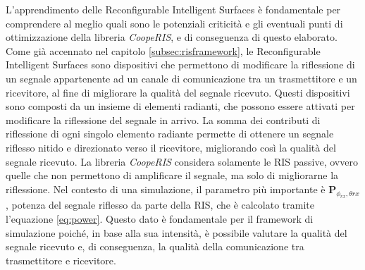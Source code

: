 L'apprendimento delle Reconfigurable Intelligent Surfaces è fondamentale per comprendere
al meglio quali sono le potenziali criticità e gli eventuali punti di ottimizzazione
della libreria \textit{CoopeRIS}, e di conseguenza di questo elaborato. Come già
accennato nel capitolo \ref{subsec:risframework}, le Reconfigurable Intelligent Surfaces
sono dispositivi che permettono di modificare la riflessione di un segnale appartenente
ad un canale di comunicazione tra un trasmettitore e un ricevitore, al fine di
migliorare la qualità del segnale ricevuto. Questi dispositivi sono composti da un
insieme di elementi radianti, che possono essere attivati per modificare la
riflessione del segnale in arrivo. La somma dei contributi di riflessione di ogni
singolo elemento radiante permette di ottenere un segnale riflesso nitido e direzionato
verso il ricevitore, migliorando così la qualità del segnale ricevuto. La libreria
\textit{CoopeRIS} considera solamente le RIS passive, ovvero quelle che non permettono
di amplificare il segnale, ma solo di migliorarne la riflessione. Nel contesto di
una simulazione, il parametro più importante è
$\textbf{P}_{\phi_{rx},\theta{rx}}$, potenza del segnale riflesso da parte della
RIS, che è calcolato tramite l'equazione \ref{eq:power}. Questo dato è fondamentale
per il framework di simulazione poiché, in base alla sua intensità, è possibile valutare
la qualità del segnale ricevuto e, di conseguenza, la qualità della comunicazione
tra trasmettitore e ricevitore.

